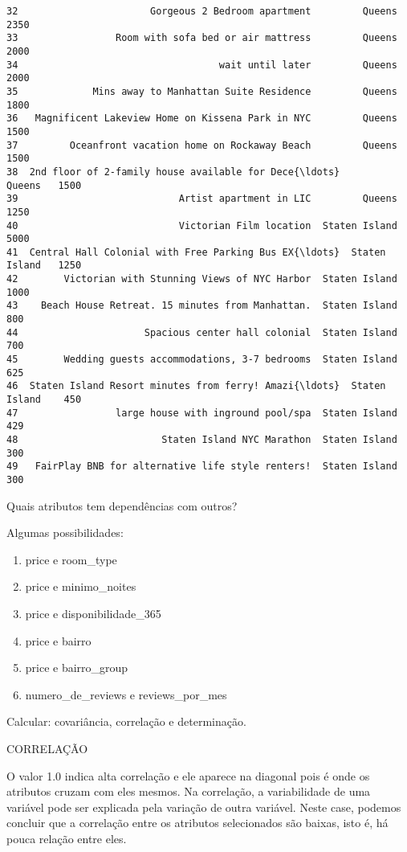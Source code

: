 \documentclass[11pt]{article}
\begin{document}
\begin{Verbatim}[commandchars=\\\{\}]
32                       Gorgeous 2 Bedroom apartment         Queens   2350
33                 Room with sofa bed or air mattress         Queens   2000
34                                   wait until later         Queens   2000
35             Mins away to Manhattan Suite Residence         Queens   1800
36   Magnificent Lakeview Home on Kissena Park in NYC         Queens   1500
37         Oceanfront vacation home on Rockaway Beach         Queens   1500
38  2nd floor of 2-family house available for Dece{\ldots}         Queens   1500
39                            Artist apartment in LIC         Queens   1250
40                            Victorian Film location  Staten Island   5000
41  Central Hall Colonial with Free Parking Bus EX{\ldots}  Staten Island   1250
42        Victorian with Stunning Views of NYC Harbor  Staten Island   1000
43    Beach House Retreat. 15 minutes from Manhattan.  Staten Island    800
44                      Spacious center hall colonial  Staten Island    700
45        Wedding guests accommodations, 3-7 bedrooms  Staten Island    625
46  Staten Island Resort minutes from ferry! Amazi{\ldots}  Staten Island    450
47                 large house with inground pool/spa  Staten Island    429
48                         Staten Island NYC Marathon  Staten Island    300
49   FairPlay BNB for alternative life style renters!  Staten Island    300
    \end{Verbatim}

    Quais atributos tem dependências com outros?

Algumas possibilidades:

\begin{enumerate}
\def\labelenumi{\alph{enumi})}
\item
  price e room\_type
\item
  price e minimo\_noites
\item
  price e disponibilidade\_365
\item
  price e bairro
\item
  price e bairro\_group
\item
  numero\_de\_reviews e reviews\_por\_mes
\end{enumerate}

Calcular: covariância, correlação e determinação.

CORRELAÇÃO

O valor 1.0 indica alta correlação e ele aparece na diagonal pois é onde
os atributos cruzam com eles mesmos. Na correlação, a variabilidade de
uma variável pode ser explicada pela variação de outra variável. Neste
case, podemos concluir que a correlação entre os atributos selecionados
são baixas, isto é, há pouca relação entre eles.
\end{document}
